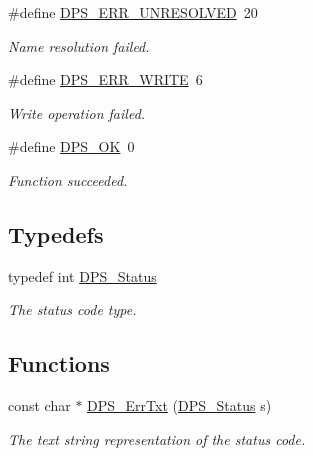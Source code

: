 \begin{DoxyCompactItemize}
\mbox{\label{group__status_gab1a09e3fc51905cc823298f964ad60e6}} 
\#define \hyperlink{group__status_gab1a09e3fc51905cc823298f964ad60e6}{D\+P\+S\+\_\+\+E\+R\+R\+\_\+\+U\+N\+R\+E\+S\+O\+L\+V\+ED}~20
\begin{DoxyCompactList}\small\item\em Name resolution failed. \end{DoxyCompactList}\item 
\mbox{\label{group__status_ga1d0f98f61006267befea4de4378a18d8}} 
\#define \hyperlink{group__status_ga1d0f98f61006267befea4de4378a18d8}{D\+P\+S\+\_\+\+E\+R\+R\+\_\+\+W\+R\+I\+TE}~6
\begin{DoxyCompactList}\small\item\em Write operation failed. \end{DoxyCompactList}\item 
\mbox{\label{group__status_ga0ea3dd37bc558859ae0cb5a4f79a4bdd}} 
\#define \hyperlink{group__status_ga0ea3dd37bc558859ae0cb5a4f79a4bdd}{D\+P\+S\+\_\+\+OK}~0
\begin{DoxyCompactList}\small\item\em Function succeeded. \end{DoxyCompactList}\end{DoxyCompactItemize}
\subsection*{Typedefs}
\begin{DoxyCompactItemize}
\item 
\mbox{\label{group__status_ga30395a84d3cad9d4ec29848106415038}} 
typedef int \hyperlink{group__status_ga30395a84d3cad9d4ec29848106415038}{D\+P\+S\+\_\+\+Status}
\begin{DoxyCompactList}\small\item\em The status code type. \end{DoxyCompactList}\end{DoxyCompactItemize}
\subsection*{Functions}
\begin{DoxyCompactItemize}
\item 
const char $\ast$ \hyperlink{group__status_ga916083e3c32631f9d412c84c0999481f}{D\+P\+S\+\_\+\+Err\+Txt} (\hyperlink{group__status_ga30395a84d3cad9d4ec29848106415038}{D\+P\+S\+\_\+\+Status} s)
\begin{DoxyCompactList}\small\item\em The text string representation of the status code. \end{DoxyCompactList}\end{DoxyCompactItemize}


